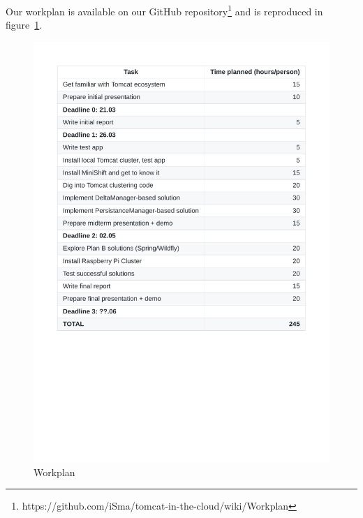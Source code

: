 \documentclass[11pt,a4paper]{article}
\begin{document}
Our workplan is available on our GitHub
repository\footnote{https://github.com/iSma/tomcat-in-the-cloud/wiki/Workplan}
and is reproduced in figure~\ref{fig:workplan}.

\begin{figure}[H]
    \centering
    \includegraphics[trim=400 150 400 0]{workplan}
    \caption{Workplan}\label{fig:workplan}
\end{figure}
\end{document}
